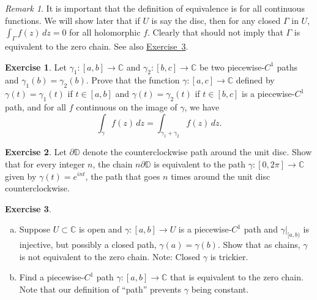 \documentclass[12pt,openany]{book}
\newcommand{\C}{{\mathbb{C}}}
\newcommand{\D}{{\mathbb{D}}}
\newcommand{\myquote}[1]{``#1''}
\theoremstyle{plain}
\theoremstyle{remark}
\newtheorem{remark}[thm]{Remark}
\theoremstyle{definition}
\newenvironment{exbox}{%
    \def\FrameCommand{\vrule width 1pt \relax\hspace{10pt}}%
    \MakeFramed{\advance\hsize-\width\FrameRestore}%
}{%
    \endMakeFramed
}
\newenvironment{exparts}{%
    \leavevmode\begin{enumerate}[a),noitemsep,topsep=0pt,parsep=0pt,partopsep=0pt]
}{%
    \end{enumerate}
}
\theoremstyle{exercise}
\newtheorem{exercise}{Exercise}[section]
\theoremstyle{example}
\newcommand{\exerciseref}[1]{\hyperref[#1]{Exercise~\ref*{#1}}}
\begin{document}
\begin{remark}
It is important that the definition of equivalence is for all continuous
functions.  We will show later that if $U$ is say the disc, then for
any closed $\Gamma$ in $U$, $\int_\Gamma f(z) \, dz = 0$ for all holomorphic $f$.
Clearly that should not imply that $\Gamma$ is equivalent to the zero
chain.
See also \exerciseref{exercise:nonconstantnonzerochain}.
\end{remark}

\begin{exbox}
\begin{exercise}%
\label{exercise:pathsum}
Let $\gamma_1 \colon [a,b] \to \C$ and $\gamma_2 \colon [b,c] \to \C$
be two piecewise-$C^1$ paths and $\gamma_1(b)=\gamma_2(b)$.
Prove that the function $\gamma \colon [a,c] \to
\C$ defined by $\gamma(t) = \gamma_1(t)$ if $t \in [a,b]$ and $\gamma(t)
= \gamma_2(t)$ if $t \in [b,c]$ is a piecewise-$C^1$ path, and
for all $f$ continuous on the image of $\gamma$, we have
\begin{equation*}
\int_{\gamma} f(z)\,dz = \int_{\gamma_1 + \gamma_2} f(z) \, dz .
\end{equation*}
\end{exercise}

\begin{exercise}
Let $\partial \D$ denote the counterclockwise path around the unit disc.
Show that for every integer $n$, the chain $n \partial \D$ is equivalent to
the path $\gamma \colon [0,2\pi] \to \C$ given by $\gamma(t) = e^{int}$,
the path that goes $n$ times around the unit disc counterclockwise.
\end{exercise}

\begin{exercise} \label{exercise:nonconstantnonzerochain}
\begin{exparts}
\item
Suppose $U \subset \C$ is open and
$\gamma \colon [a,b] \to U$
is a piecewise-$C^1$
path and $\gamma|_{[a,b)}$ is injective, but possibly a closed path,
$\gamma(a)=\gamma(b)$.  Show that as chains, $\gamma$ is not equivalent to the zero chain.
Note: Closed $\gamma$ is trickier.
\item
Find a piecewise-$C^1$ path $\gamma \colon [a,b] \to \C$
that is equivalent to the zero chain.  Note that our definition of
\myquote{path}
prevents $\gamma$ being constant.
\end{exparts}
\end{exercise}
\end{exbox}
\end{document}
